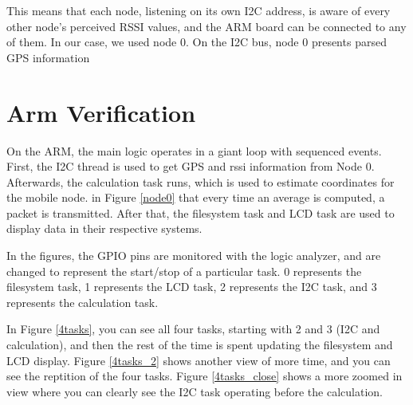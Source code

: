 \documentclass{article}
\begin{document}
This means that each node, listening on its own I2C address, is aware of every
other node's perceived RSSI values, and the ARM board can be connected to any of
them.  In our case, we used node 0.  On the I2C bus, node 0 presents parsed GPS
information

\section*{Arm Verification}
On the ARM, the main logic operates in a giant loop with sequenced events.
First, the I2C thread is used to get GPS and rssi information from Node 0.
Afterwards, the calculation task runs, which is used to estimate coordinates for
the mobile node.   in Figure \ref{node0} that every time an average is computed, a
packet is transmitted.  After that, the filesystem task and LCD task are used to
display data in their respective systems.

In the figures, the GPIO pins are monitored with the logic analyzer, and are
changed to represent the start/stop of a particular task.  0 represents the
filesystem task, 1 represents the LCD task, 2 represents the I2C task,
and 3 represents the calculation task.

In Figure \ref{4tasks}, you can see all four tasks, starting with 2 and 3 (I2C and
calculation), and then the rest of the time is spent updating the filesystem and
LCD display.  Figure \ref{4tasks_2} shows another view of more time, and you can see
the reptition of the four tasks.  Figure \ref{4tasks_close} shows a more zoomed in view
where you can clearly see the I2C task operating before the calculation.

\newpage
\end{document}
